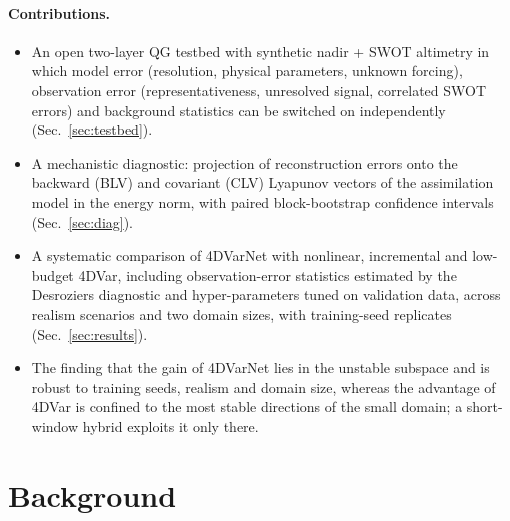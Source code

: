 \documentclass[10pt,a4paper]{article}
\begin{document}
\paragraph{Contributions.}
\begin{itemize}\itemsep0pt
\item An open two-layer QG testbed with synthetic nadir + SWOT altimetry in which model error (resolution, physical
  parameters, unknown forcing), observation error (representativeness, unresolved signal, correlated SWOT errors) and
  background statistics can be switched on independently (Sec.~\ref{sec:testbed}).
\item A mechanistic diagnostic: projection of reconstruction errors onto the backward (BLV) and covariant (CLV)
  Lyapunov vectors of the assimilation model in the energy norm, with paired block-bootstrap confidence intervals
  (Sec.~\ref{sec:diag}).
\item A systematic comparison of 4DVarNet with nonlinear, incremental and low-budget 4DVar, including
  observation-error statistics estimated by the Desroziers diagnostic and hyper-parameters tuned on validation data,
  across realism scenarios and two domain sizes, with training-seed replicates (Sec.~\ref{sec:results}).
\item The finding that the gain of 4DVarNet lies in the unstable subspace and is robust to training seeds, realism
  and domain size, whereas the advantage of 4DVar is confined to the most stable directions of the small
  domain; a short-window hybrid exploits it only there.
\end{itemize}

\section{Background}
\end{document}
